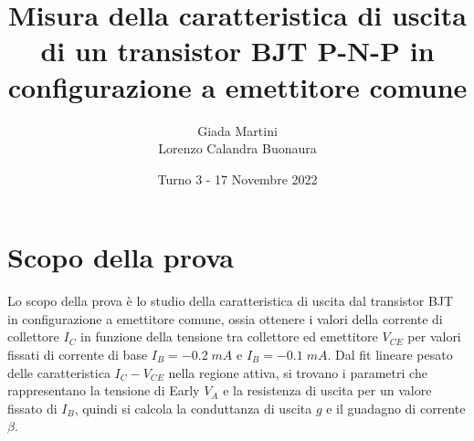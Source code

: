 \documentclass[a4paper, 11pt]{article}
\title{\textbf{Misura della caratteristica di uscita di un transistor BJT P-N-P in configurazione a emettitore comune}}
\author{Giada Martini \\ Lorenzo Calandra Buonaura}
\date{Turno 3 - 17 Novembre 2022}
\begin{document}
\maketitle

\section{Scopo della prova}
Lo scopo della prova è lo studio della caratteristica di uscita dal transistor BJT in configurazione a emettitore comune, ossia ottenere i valori della corrente di collettore $I_C$ in funzione della tensione tra collettore ed emettitore $V_{CE}$  per valori fissati di corrente di base $I_B = -0.2 \; mA $ e $I_B = -0.1 \; mA$. Dal fit lineare pesato delle caratteristica $I_C-V_{CE}$ nella regione attiva, si trovano i parametri che rappresentano la tensione di Early $V_A$ e la resistenza di uscita per un valore fissato di $I_B$, quindi si calcola la conduttanza di uscita $g$ e il guadagno di corrente $\beta$. 
\end{document}
